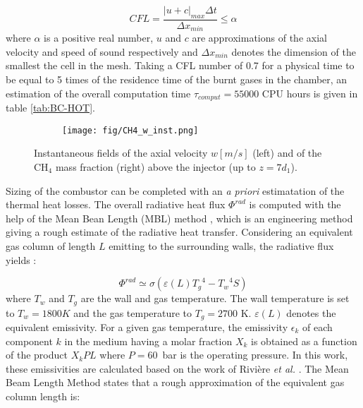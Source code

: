 \documentclass[twocolumn,10pt]{asme2e}
\begin{document}
\begin{equation}
\label{eq:CFL}
CFL = \frac{|u+c|_{max} \Delta t}{\Delta x_{min}} \leqslant \alpha   
\end{equation} 
where $\alpha$ is a positive real number, $u$ and $c$ are approximations of the axial velocity and speed of sound respectively and $\Delta x_{min}$ denotes the dimension of the smallest the cell in the mesh.   
Taking a CFL number of 0.7 for a physical time to be equal to 5 times of the residence time of the burnt gases in the chamber, an estimation of the overall computation time $\tau_{comput} = 55000$ CPU hours is given in table \ref{tab:BC-HOT}. \\ 
\begin{figure}
   \begin{subfigure}[b]{1\linewidth}        %
       \centering
       \texttt{[image: fig/CH4\_w\_inst.png]}
   \end{subfigure}
      \caption{Instantaneous fields of the axial velocity $w [m/s]$ (left) and of the CH$_4$ mass fraction (right) above the injector (up to $z=7d_1$).}
   \label{fig:field_inst_cold_HP}
   \vspace{-0.05 cm}
\end{figure}


Sizing of the combustor can be completed with an \textit{a priori} estimatation of the thermal heat losses. The overall radiative heat flux $\Phi^{rad}$ is computed with the help of the Mean Bean Length (MBL) method \cite{yuen2008definition}, which is an engineering method giving a rough estimate of the radiative heat transfer.  Considering an equivalent gas column of length $L$ emitting to the surrounding walls, the radiative flux yields \cite{lefebvre1960heat}:

\begin{equation}
\label{eq:mean_beam_length}
\Phi^{rad} \simeq  \sigma \left( \varepsilon (L)  {T_{g}}^4- {T_{w}}^4 S \right) 
\end{equation}
%
where $T_{w}$ and $T_{g}$ are the wall and gas temperature. The wall temperature is set to $T_w = 1800K$ and the gas temperature to $T_g=2700$ K. $\varepsilon(L)$ denotes the equivalent emissivity. For a given gas temperature, the emissivity $\epsilon_k$ of each component $k$ in the medium having a molar fraction $X_k$ is obtained as a function of the product $X_k P L$ where $P=60$~bar is the operating pressure. In this work, these emissivities are calculated based on the work of  Rivi{\`e}re \textit{et al.} \cite{riviere2012updated}. The Mean Beam Length Method states that a rough approximation of the equivalent gas column length is:
\end{document}

